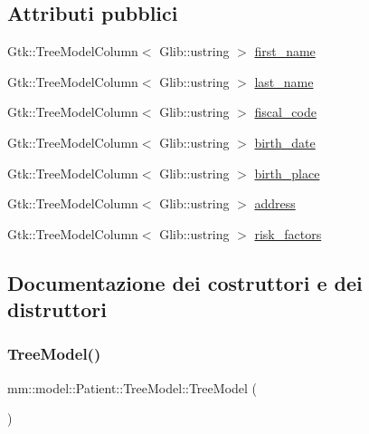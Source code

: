 \subsection*{Attributi pubblici}
\begin{DoxyCompactItemize}
\item 
Gtk\+::\+Tree\+Model\+Column$<$ Glib\+::ustring $>$ \hyperlink{structmm_1_1model_1_1_patient_1_1_tree_model_adf28688b198a38740eaff550b3c2c1fb}{first\+\_\+name}
\item 
Gtk\+::\+Tree\+Model\+Column$<$ Glib\+::ustring $>$ \hyperlink{structmm_1_1model_1_1_patient_1_1_tree_model_a0ed75cd3b4f8d2378abe0de229e4c052}{last\+\_\+name}
\item 
Gtk\+::\+Tree\+Model\+Column$<$ Glib\+::ustring $>$ \hyperlink{structmm_1_1model_1_1_patient_1_1_tree_model_aa2fecd995942eb8662bda71300bb6ae9}{fiscal\+\_\+code}
\item 
Gtk\+::\+Tree\+Model\+Column$<$ Glib\+::ustring $>$ \hyperlink{structmm_1_1model_1_1_patient_1_1_tree_model_ac1420b4e9a91af21da1bb6be8dd73c9b}{birth\+\_\+date}
\item 
Gtk\+::\+Tree\+Model\+Column$<$ Glib\+::ustring $>$ \hyperlink{structmm_1_1model_1_1_patient_1_1_tree_model_a9c168aebc887200f36b69740e73b3067}{birth\+\_\+place}
\item 
Gtk\+::\+Tree\+Model\+Column$<$ Glib\+::ustring $>$ \hyperlink{structmm_1_1model_1_1_patient_1_1_tree_model_a32f489915cba3373fa445c35d7137192}{address}
\item 
Gtk\+::\+Tree\+Model\+Column$<$ Glib\+::ustring $>$ \hyperlink{structmm_1_1model_1_1_patient_1_1_tree_model_a3acdb3bd280b1f59d8d94f5d2806db21}{risk\+\_\+factors}
\end{DoxyCompactItemize}


\subsection{Documentazione dei costruttori e dei distruttori}
\mbox{\label{structmm_1_1model_1_1_patient_1_1_tree_model_a53ebc678daee18b03328be60d1c69bf4}} 
\subsubsection{\texorpdfstring{Tree\+Model()}{TreeModel()}}
{\footnotesize\ttfamily mm\+::model\+::\+Patient\+::\+Tree\+Model\+::\+Tree\+Model (\begin{DoxyParamCaption}{ }\end{DoxyParamCaption})\hspace{0.3cm}{\ttfamily [noexcept]}}



